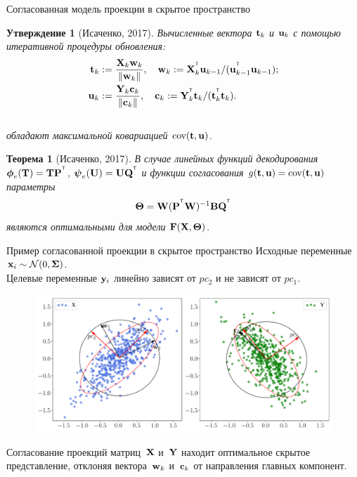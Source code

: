 \documentclass[10pt]{beamer}
\newtheorem{statement}{Утверждение}
\newtheorem{rustheorem}{Теорема}
\begin{document}
\begin{frame}{Согласованная модель проекции в скрытое пространство}
	\begin{statement}[Исаченко, 2017]
		Вычисленные вектора $\mathbf{t}_k$ и $\mathbf{u}_k$ с помощью итеративной процедуры обновления:
		\vspace{-0.2cm}
		\begin{align*}
			\mathbf{t}_k &:= \frac{\mathbf{X}_k \mathbf{w}_k}{\|\mathbf{w}_k\|}, \quad  \mathbf{w}_k := \mathbf{X}_k^{^{\text{\tiny\sffamily\upshape\mdseries T}}} \mathbf{u}_{k-1} / (\mathbf{u}_{k-1}^{^{\text{\tiny\sffamily\upshape\mdseries T}}} \mathbf{u}_{k-1}); \\ 
			\mathbf{u}_k &:= \frac{\mathbf{Y}_k \mathbf{c}_k}{\| \mathbf{c}_k \|}, \quad \mathbf{c}_k := \mathbf{Y}_k^{^{\text{\tiny\sffamily\upshape\mdseries T}}} \mathbf{t}_k / (\mathbf{t}_k^{^{\text{\tiny\sffamily\upshape\mdseries T}}} \mathbf{t}_k).
		\end{align*}
		\vspace{-0.5cm} \\
		обладают максимальной ковариацией $\textnormal{cov}(\mathbf{t}, \mathbf{u})$.
	\end{statement}

	\begin{rustheorem}[Исаченко, 2017]
		В случае линейных функций декодирования $\boldsymbol{\phi}_e (\mathbf{T}) = \mathbf{T} \mathbf{P}^{^{\text{\tiny\sffamily\upshape\mdseries T}}}$, $\boldsymbol{\psi}_e (\mathbf{U}) = \mathbf{U} \mathbf{Q}^{^{\text{\tiny\sffamily\upshape\mdseries T}}}$ и функции согласования $g(\mathbf{t}, \mathbf{u}) = \textnormal{cov}(\mathbf{t}, \mathbf{u})$ параметры
		\[
		\boldsymbol{\Theta} = \mathbf{W} (\mathbf{P}^{^{\text{\tiny\sffamily\upshape\mdseries T}}} \mathbf{W})^{-1} \mathbf{B} \mathbf{Q}^{^{\text{\tiny\sffamily\upshape\mdseries T}}}
		\]
		являются оптимальными для модели $\mathbf{F}(\mathbf{X}, \boldsymbol{\Theta})$.
	\end{rustheorem}
\end{frame}
\begin{frame}{Пример согласованной проекции в скрытое пространство}
	Исходные переменные $\mathbf{x}_i \sim \mathcal{N}(0, \mathbf{\Sigma})$. \\ 
	Целевые переменные $\mathbf{y}_i$ линейно зависят от $pc_2$ и не зависят от $pc_1$.
	\begin{figure}[h]
	\centering
	\includegraphics[width=\linewidth]{figs/pls_toy_example}
	\end{figure}
	Согласование проекций матриц~$\mathbf{X}$ и~$\mathbf{Y}$ находит оптимальное скрытое представление, отклоняя вектора~$\mathbf{w}_k$ и~$\mathbf{c}_k$ от направления главных компонент. 
\end{frame}
\end{document}
